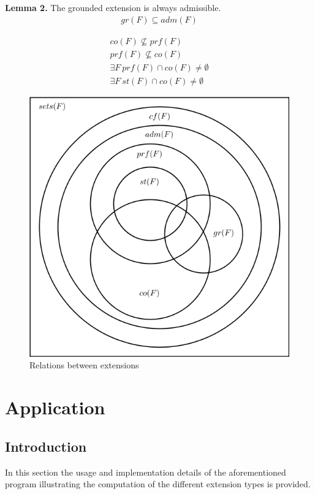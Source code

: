 \documentclass[draft,final]{vutinfth} %
\begin{document}
\textbf{Lemma 2.} %
The grounded extension is always admissible. %
\begin{align}
	gr(F)\subseteq adm(F)
\end{align}


\begin{align}
	co(F)\not\subseteq prf(F)\\
	prf(F)\not\subseteq co(F)\\
	\exists F\ prf(F)\cap co(F) \not = \emptyset\\
	\exists F\ st(F)\cap co(F) \not = \emptyset 
\end{align}

\FloatBarrier
	\begin{figure}[!htb]
		\centering
		\includegraphics[scale=0.6]{pics/diagram.png}
		\caption{Relations between extensions}
	\end{figure}
\FloatBarrier

\chapter{Application}

\section{Introduction}
In this section the usage and implementation details of the aforementioned program illustrating the computation of the different extension types is provided.
\end{document}
